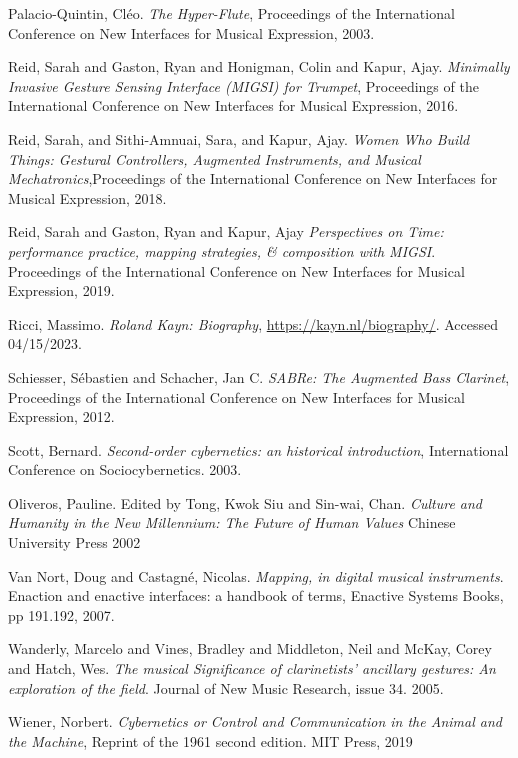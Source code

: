 \begin{thebibliography}{99}
 Palacio-Quintin, Cléo. \emph{The Hyper-Flute}, Proceedings of the International Conference on New Interfaces for Musical Expression, 2003.

 Reid, Sarah and Gaston, Ryan and Honigman, Colin and Kapur, Ajay. \emph{Minimally Invasive Gesture Sensing Interface (MIGSI) for Trumpet}, Proceedings of the International Conference on New Interfaces for Musical Expression, 2016.

 Reid, Sarah, and Sithi-Amnuai, Sara, and Kapur, Ajay. \emph{Women Who Build Things: Gestural Controllers, Augmented Instruments, and Musical Mechatronics},Proceedings of the International Conference on New Interfaces for Musical Expression, 2018.

 Reid, Sarah and Gaston, Ryan and Kapur, Ajay \emph{Perspectives on Time: performance practice, mapping strategies, \& composition with MIGSI}. Proceedings of the International Conference on New Interfaces for Musical Expression, 2019.

 Ricci, Massimo. \emph{Roland Kayn: Biography}, \url{https://kayn.nl/biography/}. Accessed 04/15/2023.

 Schiesser, S{\'e}bastien and Schacher, Jan C. \emph{SABRe: The Augmented Bass Clarinet}, Proceedings of the International Conference on New Interfaces for Musical Expression, 2012.

 Scott, Bernard. \emph{Second-order cybernetics: an historical introduction}, International Conference on Sociocybernetics. 2003.

 Oliveros, Pauline. Edited by Tong, Kwok Siu and Sin-wai, Chan. \emph{Culture and Humanity in the New Millennium: The Future of Human Values} Chinese University Press 2002

 Van Nort, Doug and Castagné, Nicolas. \emph{Mapping, in digital musical instruments}. Enaction and enactive interfaces: a handbook of terms, Enactive Systems Books, pp 191.192, 2007.

 Wanderly, Marcelo and Vines, Bradley and Middleton, Neil and McKay, Corey and Hatch, Wes. \emph{The musical Significance of clarinetists' ancillary gestures: An exploration of the field}. Journal of New Music Research, issue 34. 2005.

 Wiener, Norbert. \emph{Cybernetics or Control and Communication in the Animal and the Machine}, Reprint of the 1961 second edition. MIT Press, 2019


\end{thebibliography}



